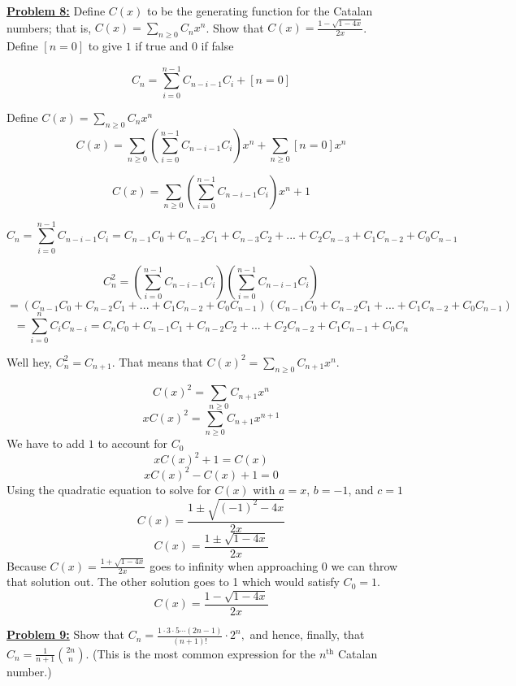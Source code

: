 \documentclass[10pt, AMS Euler]{article}
\newcommand{\ds}{\displaystyle}
\begin{document}
	\noindent\underline{\bf Problem 8:} Define $C(x)$ to be the generating function for the Catalan numbers; that is, $\ds C(x) = \sum_{n \geq 0}C_nx^n$. Show that $C(x) = \ds \frac{1 - \sqrt{1-4x}}{2x}$. \\

    Define $[n=0]$ to give $1$ if true and $0$ if false

    $$ C_n = \sum_{i=0}^{n-1}C_{n-i-1}C_i + [n = 0] $$

    Define $C(x) = \sum_{n\geq0} C_n x^n$ \\

    $$ C(x) = \sum_{n\geq0} \left( \sum_{i=0}^{n-1} C_{n-i-1}C_i \right)x^n + \sum_{n\geq0} [n = 0] x^n $$

    $$ C(x) = \sum_{n\geq0} \left(\sum_{i=0}^{n-1} C_{n-i-1}C_i \right)x^n + 1 $$

    $$ C_n = \sum_{i=0}^{n-1} C_{n-i-1} C_i = C_{n-1} C_0 + C_{n-2} C_{1} + C_{n-3} C_{2} + ... + C_{2} C_{n-3} + C_{1} C_{n-2} + C_{0} C_{n-1} $$

    $$ C_n^2 = \left(\sum_{i=0}^{n-1} C_{n-i-1} C_i\right) \left(\sum_{i=0}^{n-1} C_{n-i-1} C_i\right)  $$
    $$ = (C_{n-1} C_0 + C_{n-2} C_{1} + ... + C_{1} C_{n-2} + C_{0} C_{n-1}) (C_{n-1} C_0 + C_{n-2} C_{1} + ... + C_{1} C_{n-2} + C_{0} C_{n-1}) $$
    $$ = \sum_{i=0}^{n} C_i C_{n-i} = C_n C_0 + C_{n-1} C_1 + C_{n-2} C_2 + ... + C_2 C_{n-2} + C_1 C_{n-1} + C_0 C_n $$
    
    Well hey, $C_n^2 = C_{n+1}$. That means that $C(x)^2 = \sum_{n\geq0} C_{n+1} x^n$.
    
    $$ C(x)^2 = \sum_{n\geq0} C_{n+1} x^n $$
    $$ x C(x)^2 = \sum_{n\geq0} C_{n+1} x^{n+1} $$
    We have to add $1$ to account for $C_0$
    $$ x C(x)^2 + 1 = C(x) $$
    $$ x C(x)^2 - C(x) + 1 = 0 $$
    Using the quadratic equation to solve for $C(x)$ with $a=x$, $b=-1$, and $c=1$
    $$ C(x) = \frac{1 \pm \sqrt{(-1)^2 - 4x}}{2x} $$
    $$ C(x) = \frac{1 \pm \sqrt{1 - 4x}}{2x} $$
    Because $ C(x) = \frac{1 + \sqrt{1 - 4x}}{2x} $ goes to infinity when approaching 0 we can throw that solution out. The other solution goes to 1 which would satisfy $C_0 = 1$.
    $$ C(x) = \frac{1 - \sqrt{1 - 4x}}{2x} $$
	
	\noindent\underline{\bf Problem 9:} Show that $\ds C_n = \frac{1\cdot 3 \cdot 5 \cdots (2n-1)}{(n+1)!}\cdot 2^n,$
	and hence, finally, that $C_n = \ds \frac{1}{n+1} \binom{2n}{n}$. (This is the most common expression for the $n^{\mbox{th}}$ Catalan number.)\\
     
\end{document}

